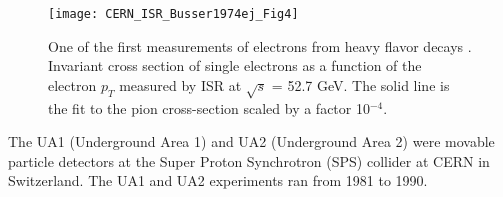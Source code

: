 \begin{figure}[h]
  \centering
  \texttt{[image: CERN\_ISR\_Busser1974ej\_Fig4]}\\
  \caption{One of the first measurements of electrons from heavy flavor decays \cite{Busser:1974ej}. Invariant cross section of single electrons as a function of the electron $p_{T}$ measured by ISR at $\sqrt{s}$ = 52.7 GeV. The solid line is the fit to the pion cross-section scaled by a factor 10$^{-4}$.} \label{fig:CERN_ISR_Busser1974ej_Fig4}
\end{figure}






The UA1 (Underground Area 1) and UA2 (Underground Area 2) were movable particle detectors at the Super Proton Synchrotron (SPS) collider at CERN in Switzerland. The UA1 and UA2 experiments ran from 1981 to 1990. 

